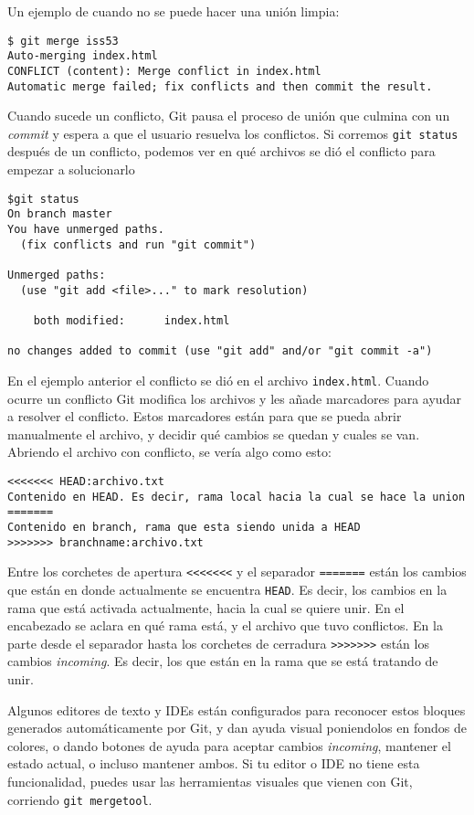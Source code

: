 \documentclass[spanish, 12pt, a4paper]{article}
\begin{document}
Un ejemplo de cuando no se puede hacer una unión limpia:
\begin{lstlisting}
$ git merge iss53
Auto-merging index.html
CONFLICT (content): Merge conflict in index.html
Automatic merge failed; fix conflicts and then commit the result.
\end{lstlisting}

Cuando sucede un conflicto, Git pausa el proceso de unión que culmina con un
\textit{commit} y espera a que el usuario resuelva los conflictos.
Si corremos \texttt{git status} después de un conflicto, podemos ver en qué
archivos se dió el conflicto para empezar a solucionarlo
\begin{lstlisting}
$git status
On branch master
You have unmerged paths.
  (fix conflicts and run "git commit")

Unmerged paths:
  (use "git add <file>..." to mark resolution)

	both modified:      index.html

no changes added to commit (use "git add" and/or "git commit -a")
\end{lstlisting}

En el ejemplo anterior el conflicto se dió en el archivo \texttt{index.html}.
Cuando ocurre un conflicto Git modifica los archivos y les añade marcadores para
ayudar a resolver el conflicto.
Estos marcadores están para que se pueda abrir manualmente el archivo, y decidir
qué cambios se quedan y cuales se van.
Abriendo el archivo con conflicto, se vería algo como esto:
\begin{lstlisting}
<<<<<<< HEAD:archivo.txt
Contenido en HEAD. Es decir, rama local hacia la cual se hace la union
=======
Contenido en branch, rama que esta siendo unida a HEAD
>>>>>>> branchname:archivo.txt
\end{lstlisting}

Entre los corchetes de apertura \texttt{<<<<<<<} y el separador \texttt{=======}
están los cambios que están en donde actualmente se encuentra \texttt{HEAD}.
Es decir, los cambios en la rama que está activada actualmente, hacia la cual se
quiere unir.
En el encabezado se aclara en qué rama está, y el archivo que tuvo conflictos.
En la parte desde el separador hasta los corchetes de cerradura \texttt{>>>>>>>}
están los cambios \textit{incoming}.
Es decir, los que están en la rama que se está tratando de unir.

Algunos editores de texto y IDEs están configurados para reconocer estos bloques
generados automáticamente por Git, y dan ayuda visual poniendolos en fondos de
colores, o dando botones de ayuda para aceptar cambios \textit{incoming},
mantener el estado actual, o incluso mantener ambos.
Si tu editor o IDE no tiene esta funcionalidad, puedes usar las herramientas
visuales que vienen con Git, corriendo \texttt{git mergetool}.
\end{document}
